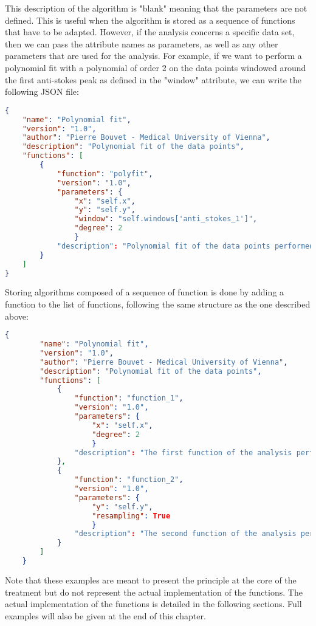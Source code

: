 This description of the algorithm is "blank" meaning that the parameters are not defined. This is useful when the algorithm is stored as a sequence of functions that have to be adapted. However, if the analysis concerns a specific data set, then we can pass the attribute names as parameters, as well as any other parameters that are used for the analysis. For example, if we want to perform a polynomial fit with a polynomial of order 2 on the data points windowed around the first anti-stokes peak as defined in the "window" attribute, we can write the following JSON file:

\begin{lstlisting}[language=json]
{
    "name": "Polynomial fit",
    "version": "1.0",
    "author": "Pierre Bouvet - Medical University of Vienna",
    "description": "Polynomial fit of the data points",
    "functions": [
        {
            "function": "polyfit",
            "version": "1.0",
            "parameters": {
                "x": "self.x",
                "y": "self.y",
                "window": "self.windows['anti_stokes_1']",
                "degree": 2
                }
            "description": "Polynomial fit of the data points performed on x=self.x and y=self.y, around the window defined by self.windows['anti_stokes_1'], with a polynomial of order 2"
        }
    ]
}
\end{lstlisting}

Storing algorithms composed of a sequence of function is done by adding a function to the list of functions, following the same structure as the one described above:

\begin{lstlisting}[language=json]
    {
        "name": "Polynomial fit",
        "version": "1.0",
        "author": "Pierre Bouvet - Medical University of Vienna",
        "description": "Polynomial fit of the data points",
        "functions": [
            {
                "function": "function_1",
                "version": "1.0",
                "parameters": {
                    "x": "self.x",
                    "degree": 2
                    }
                "description": "The first function of the analysis performed on x=self.x with a degree of 2"
            },
            {
                "function": "function_2",
                "version": "1.0",
                "parameters": {
                    "y": "self.y",
                    "resampling": True
                    }
                "description": "The second function of the analysis performed on y=self.y with resampling=True"
            }
        ]
    }
\end{lstlisting}

Note that these examples are meant to present the principle at the core of the treatment but do not represent the actual implementation of the functions. The actual implementation of the functions is detailed in the following sections. Full examples will also be given at the end of this chapter.